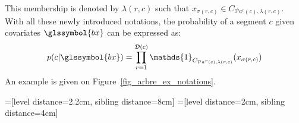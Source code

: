 This membership is denoted by $\lambda(r,c)$ such that $x_{\sigma(r,c)} \in C_{\mathcal{P}a^r(c),\lambda(r,c)}$.
With all these newly introduced notations, the probability of a segment $c$ given covariates $\glssymbol{bx}$ can be expressed as:
\begin{equation} \label{eq:tree}
p( c | \glssymbol{bx}) = \prod_{r = 1}^{\mathcal{D}(c)} \mathds{1}_{C_{\mathcal{P}a^r(c),\lambda(r,c)}} (x_{\sigma(r,c)})
\end{equation}
An example is given on Figure~\ref{fig_arbre_ex_notations}.

=[level distance=2.2cm, sibling distance=8cm]
=[level distance=2cm, sibling distance=4cm]


